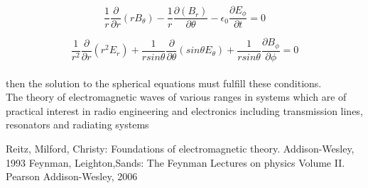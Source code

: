\documentclass[paper=a4, fontsize=11pt]{scrartcl} %
\numberwithin{equation}{section} %
\numberwithin{figure}{section} %
\numberwithin{table}{section} %
\begin{document}
\begin{equation}
\frac{1}{r} \frac{\partial }{\partial r}(r B_\theta) - \frac{1}{r}\frac{\partial (B_r)}{\partial \theta}-\epsilon_{0} \frac{\partial E_{\phi}} {\partial t} =0
\end{equation}

\begin{equation}
\frac{1}{r^{2}} \frac{\partial}{\partial r} (r^{2}E_{r})+ \frac{1}{r sin \theta} \frac{\partial}{\partial \theta} (sin \theta E_{\theta})+ \frac{1}{r sin \theta} \frac{\partial B_{\phi}}{\partial \phi} =0
\end{equation}
\\ then the solution to the spherical equations must fulfill these conditions.
\\The theory of electromagnetic waves of various ranges in systems which are of practical interest in radio engineering and electronics including transmission lines, resonators and radiating systems 
\begin{thebibliography}{2}
 Reitz, Milford, Christy: Foundations of electromagnetic theory. Addison-Wesley, 1993
 Feynman, Leighton,Sands: The Feynman Lectures on physics Volume II. Pearson Addison-Wesley, 2006

\end{thebibliography}
\end{document}
